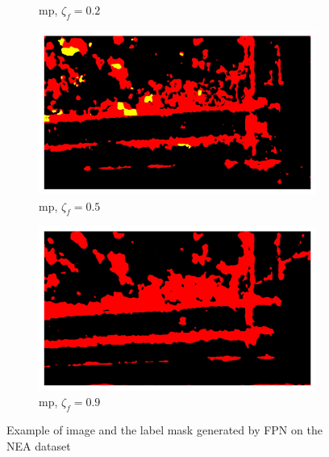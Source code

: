 \documentclass[mathematics,article,submit,pdftex,moreauthors]{Definitions/mdpi}
\begin{document}
\begin{figure}[!ht]
\begin{subfigure}[t]{.29\textwidth}
        \caption{\ac{mp}, $\zeta_f=0.2$}
        \label{fig:results:pruning:visualization:nea-fpn-mp-0.2}
      \end{subfigure}
      \begin{subfigure}[t]{.29\textwidth} 
        \centering
        \includegraphics[width=.95\linewidth]{figures/pruning-results/fpn_NEA_movement/10/mask_0.5.jpg}
        \caption{\ac{mp}, $\zeta_f=0.5$}
        \label{fig:results:pruning:visualization:nea-fpn-mp-0.5}
      \end{subfigure}
      \begin{subfigure}[t]{.29\textwidth} 
        \centering
        \includegraphics[width=.95\linewidth]{figures/pruning-results/fpn_NEA_movement/10/mask_0.9.jpg}
        \caption{\ac{mp}, $\zeta_f=0.9$}
        \label{fig:results:pruning:visualization:nea-fpn-mp-0.9}
      \end{subfigure}
      \caption{Example of image and the label mask generated by FPN on the NEA dataset}
      \label{fig:results:pruning:visualization:nea}
  \end{figure}
\end{document}
